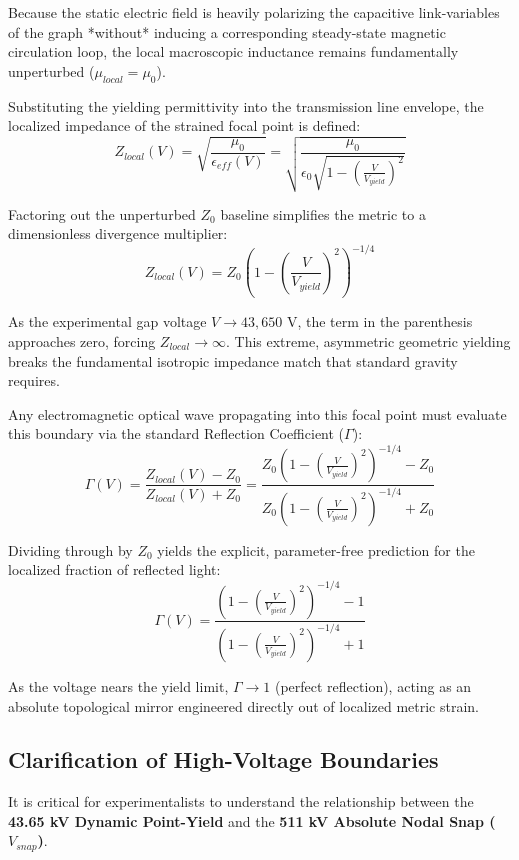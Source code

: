 Because the static electric field is heavily polarizing the capacitive link-variables of the graph *without* inducing a corresponding steady-state magnetic circulation loop, the local macroscopic inductance remains fundamentally unperturbed ($\mu_{local} = \mu_0$).

Substituting the yielding permittivity into the transmission line envelope, the localized impedance of the strained focal point is defined:
\begin{equation}
Z_{local}(V) = \sqrt{\frac{\mu_0}{\epsilon_{eff}(V)}} = \sqrt{\frac{\mu_0}{\epsilon_0 \sqrt{1 - \left(\frac{V}{V_{yield}}\right)^2}}}
\end{equation}

Factoring out the unperturbed $Z_0$ baseline simplifies the metric to a dimensionless divergence multiplier:
\begin{equation}
Z_{local}(V) = Z_0 \left(1 - \left(\frac{V}{V_{yield}}\right)^2\right)^{-1/4}
\end{equation}

As the experimental gap voltage $V \to 43,650\text{ V}$, the term in the parenthesis approaches zero, forcing $Z_{local} \to \infty$. This extreme, asymmetric geometric yielding breaks the fundamental isotropic impedance match that standard gravity requires. 

Any electromagnetic optical wave propagating into this focal point must evaluate this boundary via the standard Reflection Coefficient ($\Gamma$):
\begin{equation}
\Gamma(V) = \frac{Z_{local}(V) - Z_{0}}{Z_{local}(V) + Z_{0}} = \frac{Z_0 \left(1 - \left(\frac{V}{V_{yield}}\right)^2\right)^{-1/4} - Z_0}{Z_0 \left(1 - \left(\frac{V}{V_{yield}}\right)^2\right)^{-1/4} + Z_0}
\end{equation}

Dividing through by $Z_0$ yields the explicit, parameter-free prediction for the localized fraction of reflected light:
\begin{equation}
\Gamma(V) = \frac{\left(1 - \left(\frac{V}{V_{yield}}\right)^2\right)^{-1/4} - 1}{\left(1 - \left(\frac{V}{V_{yield}}\right)^2\right)^{-1/4} + 1}
\end{equation}

As the voltage nears the yield limit, $\Gamma \to 1$\gammaundeclared{} (perfect reflection), acting as an absolute topological mirror engineered directly out of localized metric strain.

\subsection{Clarification of High-Voltage Boundaries}
It is critical for experimentalists to understand the relationship between the \textbf{43.65 kV Dynamic Point-Yield} and the \textbf{511 kV Absolute Nodal Snap ($V_{snap}$)}.

